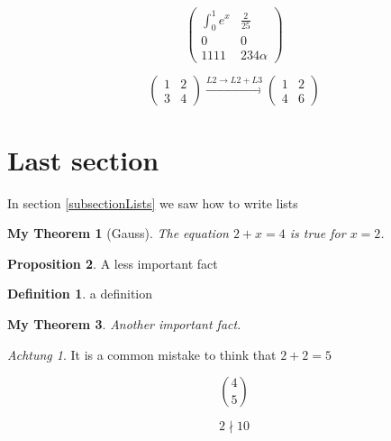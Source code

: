 \documentclass[10pt,a4paper]{article}
\newtheorem{mythm}{My Theorem}[section]
\theoremstyle{definition}
\newtheorem{prop}[mythm]{Proposition}
\newtheorem{defi}{Definition}
\theoremstyle{remark}
\newtheorem*{warning}{Achtung}
\begin{document}
\[
	\begin{pmatrix}
		\int_0^1 e^x  &  \frac{2}{25} \\
		0 & 0 \\
		1111 & 234\alpha
	\end{pmatrix}
\]

\[
\begin{pmatrix}
1 & 2\\
3 & 4
\end{pmatrix}
\overset{L2\rightarrow L2+L3}\longrightarrow
\begin{pmatrix}
1 & 2\\
4 & 6
\end{pmatrix}
\]

\section{Last section}

In section \ref{subsectionLists} we saw how to write lists

\begin{mythm}[Gauss]
The equation \(2+x=4\) is true for \(x=2\).
\end{mythm}

\begin{prop}
A less important fact
\end{prop}

\begin{defi}
a definition
\end{defi}

\begin{mythm}
Another important fact.
\end{mythm}

\begin{warning}
It is a common mistake to think that \(2+2=5\)
\end{warning}
\[\binom45\]

\[ 2 \nmid 10 \]
\end{document}
